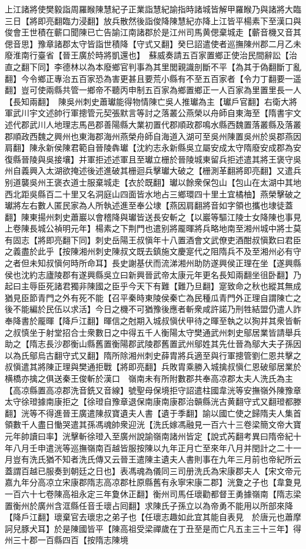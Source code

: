 上江諸將使樊毅詣周羅睺陳慧紀子正業詣慧紀諭指時諸城皆解甲羅睺乃與諸將大臨三日【將即亮翻臨力浸翻】放兵散然後詣俊降陳慧紀亦降上江皆平楊素下至漢口與俊會王世積在蘄口聞陳已亡告諭江南諸郡於是江州司馬黄偲棄城走【蘄音機又音其偲音思】豫章諸郡太守皆詣世積降【守式又翻】癸巳詔遣使者巡撫陳州郡二月乙未廢淮南行臺省【晉王廣於時將凱還也】　蘇威奏請五百家置鄉正使治民間辭訟【治直之翻下同】李德林以為本廢鄉官判事為其里閭親識剖斷不平【為其于偽翻斷丁亂翻】今令鄉正專治五百家恐為害更甚且要荒小縣有不至五百家者【令力丁翻要一遥翻】豈可使兩縣共管一鄉帝不聽丙申制五百家為鄉置鄉正一人百家為里置里長一人【長知兩翻】　陳吳州刺史蕭瓛能得物情陳亡吳人推瓛為主【瓛戶官翻】右衛大將軍武川宇文述帥行軍摠管元契張默言等討之落叢公燕榮以舟師自東海至【隋書宇文述代郡武川人地理志馬邑郡善陽縣大業初置代郡順政郡鳴水縣西魏置落叢縣及落叢郡順政西魏之興州也東海郡海州燕榮舟師自海道入湖可至吳州陳置吳州於吳郡燕因肩翻】陳永新侯陳君範自晉陵犇瓛【沈約志永新縣吳立屬安成太守隋廢安成郡為安復縣晉陵與吳接壤】并軍拒述述軍且至瓛立栅於晉陵城東留兵拒述遣其將王褒守吳州自義興入太湖欲掩述後述進破其栅迴兵擊瓛大破之【栅測革翻將即亮翻】又遣兵别道襲吳州王褒衣道士服棄城走【衣於既翻】瓛以餘衆保包山【包山在太湖中其地西北距吳縣百二十里又名洞庭山四面皆水地占三鄉環四十里土宜橘柚】燕榮擊破之瓛將左右數人匿民家為人所執述進至奉公埭【燕因肩翻將音如字領也攜也埭徒蓋翻】陳東揚州刺史蕭巖以會稽降與瓛皆送長安斬之【以巖等驅江陵士女降陳也事見上卷陳長城公禎明元年】楊素之下荆門也遣别將龎暉將兵略地南至湘州城中將士莫有固志【將即亮翻下同】刺史岳陽王叔愼年十八置酒會文武僚吏酒酣叔愼歎曰君臣之義盡於此乎【按陳湘州刺史陳叔文既去鎮施文慶寔代之阻隋兵不及至湘州必有守之者但未知叔愼何時所命耳】長史謝基伏而流涕湘州助防遂興侯正理在坐【遂興縣侯也沈約志廬陵郡有遂興縣吳立曰新興晉武帝太康元年更名長知兩翻坐徂卧翻】乃起曰主辱臣死諸君獨非陳國之臣乎今天下有難【難乃旦翻】寔致命之秋也縱其無成猶見臣節青門之外有死不能【召平秦時東陵侯秦亡為民種瓜青門外正理自謂陳亡之後不能編於民伍以求活】今日之機不可猶豫後應者斬衆咸許諾乃刑牲結盟仍遣人詐奉降書於龎暉【降戶江翻】暉信之尅期入城叔愼伏甲待之暉至執之以狥并其衆皆斬之叔慎坐于射堂招合士衆數日之中得五千人衡陽太守樊通武州刺史鄔居業皆請舉兵助之【隋志長沙郡衡山縣舊置衡陽郡武陵郡舊置武州鄔姓其先仕晉為鄔大夫子孫因以為氏鄔烏古翻守式又翻】隋所除湘州刺史薛胄將兵適至與行軍摠管劉仁恩共擊之叔愼遣其將陳正理與樊通拒戰【將即亮翻】兵敗胄乘勝入城擒叔愼仁恩破鄔居業於横橋亦擒之俱送秦王俊斬於漢口　嶺南未有所附數郡共奉高凉郡太夫人洗氏為主【高凉縣置高凉郡洗音銑又音線】號聖母保境拒守詔遣柱國韋洸等安撫嶺外陳豫章太守徐璒據南康拒之【徐璒自豫章退保南康南康郡治贑縣洸古黄翻守式又翻璒都滕翻】洸等不得進晉王廣遣陳叔寶遺夫人書【遺于季翻】諭以國亡使之歸隋夫人集首領數千人盡日慟哭遣其孫馮魂帥衆迎洸【洗氏嫁馮融見一百六十三卷梁簡文帝大寶元年帥讀曰率】洸擊斬徐璒入至廣州說諭嶺南諸州皆定【說式芮翻考異曰隋帝紀十年八月壬申遣洸等巡撫嶺南百越皆服按陳以九年正月亡至來年八月并閏計之二十一月豈有洗氏猶不知者洗氏傳又云晉王遣陳主遺夫人書則事在九年三月前也帝紀所云蓋謂百越已服奏到朝廷之日也】表馮魂為儀同三司册洗氏為宋康郡夫人【宋文帝元嘉九年分高凉立宋康郡隋志高凉郡杜原縣舊有永寧宋康二郡】洸夐之子也【韋夐見一百六十七卷陳高祖永定三年夐休正翻】衡州司馬任瓌勸都督王勇據嶺南【隋志梁置衡州於廣州含洭縣任音壬瓌占囘翻】求陳氏子孫立以為帝勇不能用以所部來降【降戶江翻】瓌棄官去瓌忠之弟子也【任瓌志趣如此宜其能自表見　於唐元也蕭摩訶兒豚犬耳】於是陳國皆平【陳高祖受梁禪歲在丁丑至是而亡凡五主三十三年】得州三十郡一百縣四百【按隋志陳境